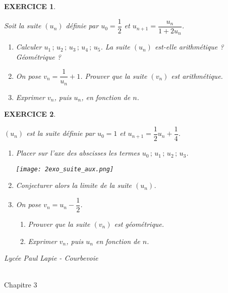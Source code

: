 \documentclass[a4paper]{article}   %
\renewcommand{\(}{\left(}
\renewcommand{\)}{\right)}
\newtheorem{EXO}{\large EXERCICE }
\newenvironment{EX}   { \setcounter{ques}{0} \begin{EXO} \hrulefill ~\vspace{0.3cm}

\normalfont}    {\end{EXO} \medskip}
\newcommand{\f}{\dfrac} 	%
\def\cl{{\large \bf{1èreG1}}}
\begin{document}
\begin{EX}
Soit la suite $(u_n)$ définie par $u_0= \f{1}{2}$ et $u_{n+1}=\f{u_n}{1+2u_n}$.
\begin{enumerate}
\item Calculer $u_1 \,;\, u_2 \,;\, u_3\,;\,u_4 \,;\,u_5$. La suite $(u_n)$ est-elle arithmétique ? Géométrique ?
\item On pose $v_n=\f{1}{u_n}+1$. Prouver que la suite $(v_n)$ est arithmétique. 
\item  Exprimer $v_n$, puis $u_n$, en fonction de $n$.
\end{enumerate}  
\end{EX}

\begin{EX}
$(u_n)$ est la suite définie par $u_0=1$ et $u_{n+1}=\f{1}{2} u_n + \f{1}{4}$.
\begin{enumerate}
\item  Placer sur l'axe des abscisses les termes $u_0\,;\,u_1 \,;\, u_2 \,;\, u_3$. 
\begin{center}
\texttt{[image: 2exo\_suite\_aux.png]}
\end{center}
\item Conjecturer alors la limite de la suite $(u_n)$.
\item On pose $v_n=u_n-\f{1}{2}$.
\begin{enumerate}
\item Prouver que la suite $(v_n)$ est géométrique.
\item Exprimer $v_n$, puis $u_n$ en fonction de $n$.
\end{enumerate}
\end{enumerate}
\end{EX}





\newpage \setcounter{EXO}{0} 
\def\dev{\Large Probabilités Conditionnelles }


\noindent\begin{minipage}{.20\linewidth}\begin{center}                  
\noindent \emph{Lycée Paul Lapie - Courbevoie}
\end{center}\end{minipage}
\begin{minipage}{1.5\linewidth}\begin{center}	
\noindent \cl\\ Chapitre 3
\end{center}\end{minipage}
\end{document}
